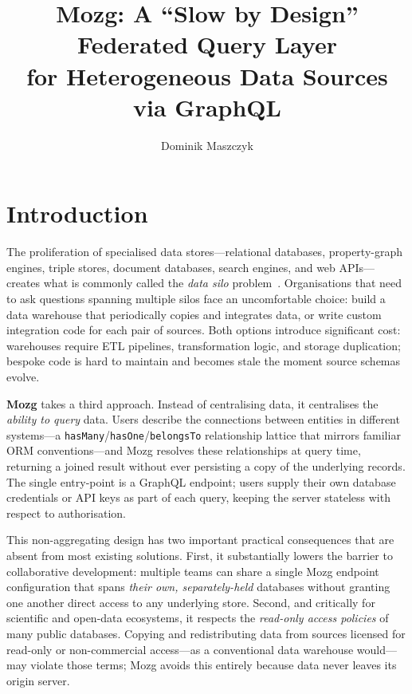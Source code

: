 \documentclass[sigconf,nonacm]{acmart}
\title[Mozg: A ``Slow by Design'' Federated Query Layer]
      {Mozg: A ``Slow by Design'' Federated Query Layer\texorpdfstring{\\}{ }
       for Heterogeneous Data Sources via GraphQL}
\author{Dominik Maszczyk}
\affiliation{%
  \institution{Independent Research}
  \city{Copenhagen}
  \country{Denmark}}
\begin{document}
\maketitle

\section{Introduction}
\label{sec:intro}

The proliferation of specialised data stores---relational databases,
property-graph engines, triple stores, document databases, search
engines, and web APIs---creates what is commonly called the
\emph{data silo} problem~\cite{halevy2006data}.  Organisations that
need to ask questions spanning multiple silos face an uncomfortable
choice: build a data warehouse that periodically copies and integrates
data, or write custom integration code for each pair of sources.
Both options introduce significant cost: warehouses require ETL
pipelines, transformation logic, and storage duplication; bespoke code
is hard to maintain and becomes stale the moment source schemas evolve.

\textbf{Mozg} takes a third approach.  Instead of centralising data, it
centralises the \emph{ability to query} data.  Users describe the
connections between entities in different systems---a
\texttt{hasMany}/\texttt{hasOne}/\texttt{belongsTo} relationship lattice
that mirrors familiar ORM conventions---and Mozg resolves these
relationships at query time, returning a joined result without ever
persisting a copy of the underlying records.  The single entry-point
is a GraphQL endpoint; users supply their own database credentials
or API keys as part of each query, keeping the server stateless with
respect to authorisation.

This non-aggregating design has two important practical consequences
that are absent from most existing solutions.  First, it substantially
lowers the barrier to collaborative development: multiple teams can
share a single Mozg endpoint configuration that spans \emph{their own,
separately-held} databases without granting one another direct access
to any underlying store.  Second, and critically for scientific and
open-data ecosystems, it respects the \emph{read-only access policies}
of many public databases.  Copying and redistributing data from sources
licensed for read-only or non-commercial access---as a conventional
data warehouse would---may violate those terms; Mozg avoids this
entirely because data never leaves its origin server.
\end{document}
